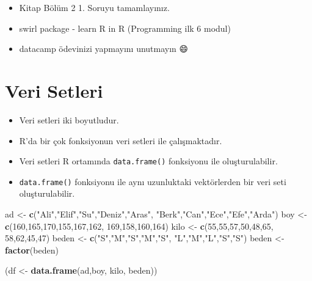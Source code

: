 \documentclass[
  oneside]{book}
\newenvironment{Shaded}{\begin{snugshade}}{\end{snugshade}}
\newcommand{\DecValTok}[1]{\textcolor[rgb]{0.00,0.00,0.81}{#1}}
\newcommand{\FunctionTok}[1]{\textcolor[rgb]{0.13,0.29,0.53}{\textbf{#1}}}
\newcommand{\NormalTok}[1]{#1}
\newcommand{\OtherTok}[1]{\textcolor[rgb]{0.56,0.35,0.01}{#1}}
\newcommand{\StringTok}[1]{\textcolor[rgb]{0.31,0.60,0.02}{#1}}
\begin{document}
\begin{itemize}
\item
  Kitap Bölüm 2 1. Soruyu tamamlayınız.
\item
  swirl package - learn R in R (Programming ilk 6 modul)
\item
  datacamp ödevinizi yapmayını unutmayın 😄
\end{itemize}

\hypertarget{veri-setleri}{%
\chapter{Veri Setleri}\label{veri-setleri}}

\begin{itemize}
\item
  Veri setleri iki boyutludur.
\item
  R'da bir çok fonksiyonun veri setleri ile çalışmaktadır.
\item
  Veri setleri R ortamında \texttt{data.frame()} fonksiyonu ile oluşturulabilir.
\item
  \texttt{data.frame()} fonksiyonu ile aynı uzunluktaki vektörlerden bir veri seti oluşturulabilir.
\end{itemize}

\begin{Shaded}
\begin{Highlighting}[]
\NormalTok{ad  }\OtherTok{\textless{}{-}}  \FunctionTok{c}\NormalTok{(}\StringTok{"Ali"}\NormalTok{,}\StringTok{"Elif"}\NormalTok{,}\StringTok{"Su"}\NormalTok{,}\StringTok{"Deniz"}\NormalTok{,}\StringTok{"Aras"}\NormalTok{, }\StringTok{"Berk"}\NormalTok{,}\StringTok{"Can"}\NormalTok{,}\StringTok{"Ece"}\NormalTok{,}\StringTok{"Efe"}\NormalTok{,}\StringTok{"Arda"}\NormalTok{)}
\NormalTok{boy }\OtherTok{\textless{}{-}} \FunctionTok{c}\NormalTok{(}\DecValTok{160}\NormalTok{,}\DecValTok{165}\NormalTok{,}\DecValTok{170}\NormalTok{,}\DecValTok{155}\NormalTok{,}\DecValTok{167}\NormalTok{,}\DecValTok{162}\NormalTok{, }\DecValTok{169}\NormalTok{,}\DecValTok{158}\NormalTok{,}\DecValTok{160}\NormalTok{,}\DecValTok{164}\NormalTok{)}
\NormalTok{kilo }\OtherTok{\textless{}{-}} \FunctionTok{c}\NormalTok{(}\DecValTok{55}\NormalTok{,}\DecValTok{55}\NormalTok{,}\DecValTok{57}\NormalTok{,}\DecValTok{50}\NormalTok{,}\DecValTok{48}\NormalTok{,}\DecValTok{65}\NormalTok{, }\DecValTok{58}\NormalTok{,}\DecValTok{62}\NormalTok{,}\DecValTok{45}\NormalTok{,}\DecValTok{47}\NormalTok{)}
\NormalTok{beden }\OtherTok{\textless{}{-}} \FunctionTok{c}\NormalTok{(}\StringTok{"S"}\NormalTok{,}\StringTok{"M"}\NormalTok{,}\StringTok{"S"}\NormalTok{,}\StringTok{"M"}\NormalTok{,}\StringTok{"S"}\NormalTok{, }\StringTok{"L"}\NormalTok{,}\StringTok{"M"}\NormalTok{,}\StringTok{"L"}\NormalTok{,}\StringTok{"S"}\NormalTok{,}\StringTok{"S"}\NormalTok{)}
\NormalTok{beden }\OtherTok{\textless{}{-}} \FunctionTok{factor}\NormalTok{(beden)}


\NormalTok{(df }\OtherTok{\textless{}{-}} \FunctionTok{data.frame}\NormalTok{(ad,boy, kilo, beden))}
\end{Highlighting}
\end{Shaded}
\end{document}

